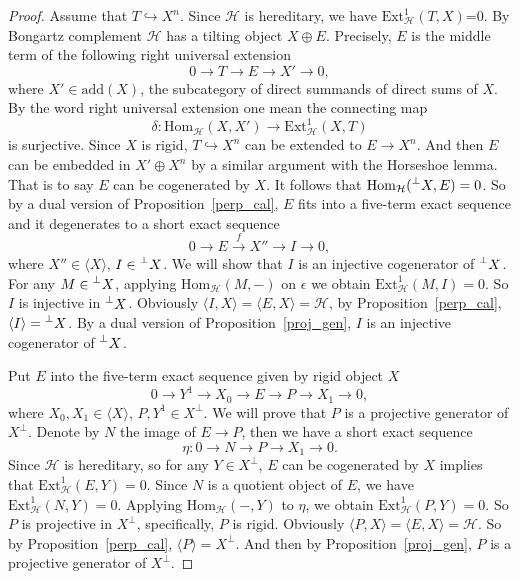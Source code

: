 \documentclass[a4paper, 11pt, reqno]{amsart}
\numberwithin{equation}{section}
\theoremstyle{remark}
\theoremstyle{definition}
\begin{document}
\begin{proof}
   Assume that $T \hookrightarrow X^n$. Since $\mathcal H$ is hereditary, we have $\mathrm{Ext}_{\mathcal H}^1(T,X)$=0. By Bongartz complement $\mathcal H$ has a tilting object $X \oplus E$. Precisely, $E$ is the middle term of the following right universal extension
   \[0 \to T \to E \to X' \to 0,\]
   where $X' \in \mathrm{add}(X)$, the subcategory of direct summands of direct sums of $X$. By the word right universal extension one mean the connecting map 
   \[\delta: \mathrm{Hom}_{\mathcal H}(X, X') \to \mathrm{Ext}_{\mathcal H}^1(X,T) \] 
   is surjective. Since $X$ is rigid, $T \hookrightarrow X^n$ can be extended to $E \to X^n$. And then $E$ can be embedded in $X' \oplus X^n$ by a similar argument with the Horseshoe lemma. That is to say $E$ can be cogenerated by $X$. It follows that $\mathrm{Hom}_{\mathcal H}(\prescript{\perp}{}{X},E)=0$. So by a dual version of Proposition~\ref{perp_cal}, $E$ fits into a five-term exact sequence and it degenerates to a short exact sequence
   \[0 \to E \xrightarrow{f} X'' \to I \to 0,\]
   where $X'' \in \langle X \rangle$, $I \in \prescript{\perp}{}{X}$. We will show that $I$ is an injective cogenerator of  $\prescript{\perp}{}{X}$. For any $M \in \prescript{\perp}{}{X}$, applying $\mathrm{Hom}_{\mathcal H}(M,-)$ on $\epsilon$ we obtain $\mathrm{Ext}_{\mathcal H}^1(M,I)=0$. So $I$ is injective in $\prescript{\perp}{}{X}$. Obviously $\langle I,X \rangle=\langle E,X \rangle=\mathcal H$, by Proposition~\ref{perp_cal}, $\langle I \rangle=\prescript{\perp}{}{X}$. By a dual version of Proposition~\ref{proj_gen}, $I$ is an injective cogenerator of $\prescript{\perp}{}{X}$.

   Put $E$ into the five-term exact sequence given by rigid object $X$
   \[
      0 \to Y^1 \to X_0 \to E \to P \to X_1 \to 0,
   \]
   where $X_0,X_1 \in \langle X \rangle$, $P,Y^1 \in X^{\perp}$. We will prove that $P$ is a projective generator of $X^{\perp}$. Denote by $N$ the image of $E \to P$, then we have a short exact sequence
   \[
      \eta: 0 \to N \to P \to X_1 \to 0.
   \]
   Since $\mathcal H$ is hereditary, so for any $Y \in X^{\perp}$, $E$ can be cogenerated by $X$ implies that $\mathrm{Ext}_{\mathcal H}^1(E,Y)=0$. Since $N$ is a quotient object of $E$, we have $\mathrm{Ext}_{\mathcal H}^1(N,Y)=0$. Applying $\mathrm{Hom}_{\mathcal H}(-,Y)$ to $\eta$, we obtain $\mathrm{Ext}_{\mathcal H}^1(P,Y)=0$. So $P$ is projective in $X^{\perp}$, specifically, $P$ is rigid. Obviously $\langle P,X \rangle=\langle E,X \rangle=\mathcal H$. So by Proposition~\ref{perp_cal}, $\langle P \rangle=X^{\perp}$. And then by Proposition~\ref{proj_gen}, $P$ is a projective generator of $X^{\perp}$.
\end{proof}
\end{document}
